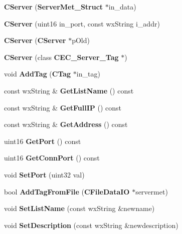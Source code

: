 \begin{DoxyCompactItemize}
\item 
{\bfseries CServer} ({\bf ServerMet\_\-Struct} $\ast$in\_\-data)\label{classCServer_afd485d17ad0c87421d561d1c48cd59eb}

\item 
{\bfseries CServer} (uint16 in\_\-port, const wxString i\_\-addr)\label{classCServer_a8754505cfb68d2ff96e22fb0a9197a42}

\item 
{\bfseries CServer} ({\bf CServer} $\ast$pOld)\label{classCServer_ac8218c0ea4ce297d4366d07834a44dfc}

\item 
{\bfseries CServer} (class {\bf CEC\_\-Server\_\-Tag} $\ast$)\label{classCServer_ac5086d2140ee4cd68fea2910e9f291e8}

\item 
void {\bfseries AddTag} ({\bf CTag} $\ast$in\_\-tag)\label{classCServer_aec73b7549c448c25c1ee6a4b4e95ec17}

\item 
const wxString \& {\bfseries GetListName} () const \label{classCServer_afe87aa605022d3c50c383ed17a5f35f6}

\item 
const wxString \& {\bfseries GetFullIP} () const \label{classCServer_ac571c2347e4f788fa14071c916532e88}

\item 
const wxString \& {\bfseries GetAddress} () const \label{classCServer_aed450f081b2c488fad86735ee69417a1}

\item 
uint16 {\bfseries GetPort} () const \label{classCServer_a552e1e898f3216e33a82d519d40539cc}

\item 
uint16 {\bfseries GetConnPort} () const \label{classCServer_a996b41819f08e5d5f632d307ccf1819b}

\item 
void {\bfseries SetPort} (uint32 val)\label{classCServer_a1ad2f947f477554d7ac71fa55e096d23}

\item 
bool {\bfseries AddTagFromFile} ({\bf CFileDataIO} $\ast$servermet)\label{classCServer_a267331d1c9b941d72e513f0aa21f57a5}

\item 
void {\bfseries SetListName} (const wxString \&newname)\label{classCServer_a1324d33f32024bd953cc7d2fd63bf3bb}

\item 
void {\bfseries SetDescription} (const wxString \&newdescription)\label{classCServer_a415fc280418181850f0a2360daa090cc}


\end{DoxyCompactItemize}

